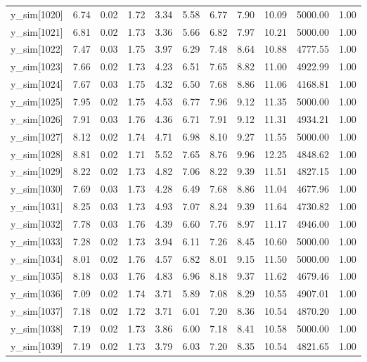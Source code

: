 \begin{table}[ht]
\begin{tabular}{rrrrrrrrrrr}
  y\_sim[1020] & 6.74 & 0.02 & 1.72 & 3.34 & 5.58 & 6.77 & 7.90 & 10.09 & 5000.00 & 1.00 \\ 
  y\_sim[1021] & 6.81 & 0.02 & 1.73 & 3.36 & 5.66 & 6.82 & 7.97 & 10.21 & 5000.00 & 1.00 \\ 
  y\_sim[1022] & 7.47 & 0.03 & 1.75 & 3.97 & 6.29 & 7.48 & 8.64 & 10.88 & 4777.55 & 1.00 \\ 
  y\_sim[1023] & 7.66 & 0.02 & 1.73 & 4.23 & 6.51 & 7.65 & 8.82 & 11.00 & 4922.99 & 1.00 \\ 
  y\_sim[1024] & 7.67 & 0.03 & 1.75 & 4.32 & 6.50 & 7.68 & 8.86 & 11.06 & 4168.81 & 1.00 \\ 
  y\_sim[1025] & 7.95 & 0.02 & 1.75 & 4.53 & 6.77 & 7.96 & 9.12 & 11.35 & 5000.00 & 1.00 \\ 
  y\_sim[1026] & 7.91 & 0.03 & 1.76 & 4.36 & 6.71 & 7.91 & 9.12 & 11.31 & 4934.21 & 1.00 \\ 
  y\_sim[1027] & 8.12 & 0.02 & 1.74 & 4.71 & 6.98 & 8.10 & 9.27 & 11.55 & 5000.00 & 1.00 \\ 
  y\_sim[1028] & 8.81 & 0.02 & 1.71 & 5.52 & 7.65 & 8.76 & 9.96 & 12.25 & 4848.62 & 1.00 \\ 
  y\_sim[1029] & 8.22 & 0.02 & 1.73 & 4.82 & 7.06 & 8.22 & 9.39 & 11.51 & 4827.15 & 1.00 \\ 
  y\_sim[1030] & 7.69 & 0.03 & 1.73 & 4.28 & 6.49 & 7.68 & 8.86 & 11.04 & 4677.96 & 1.00 \\ 
  y\_sim[1031] & 8.25 & 0.03 & 1.73 & 4.93 & 7.07 & 8.24 & 9.39 & 11.64 & 4730.82 & 1.00 \\ 
  y\_sim[1032] & 7.78 & 0.03 & 1.76 & 4.39 & 6.60 & 7.76 & 8.97 & 11.17 & 4946.00 & 1.00 \\ 
  y\_sim[1033] & 7.28 & 0.02 & 1.73 & 3.94 & 6.11 & 7.26 & 8.45 & 10.60 & 5000.00 & 1.00 \\ 
  y\_sim[1034] & 8.01 & 0.02 & 1.76 & 4.57 & 6.82 & 8.01 & 9.15 & 11.50 & 5000.00 & 1.00 \\ 
  y\_sim[1035] & 8.18 & 0.03 & 1.76 & 4.83 & 6.96 & 8.18 & 9.37 & 11.62 & 4679.46 & 1.00 \\ 
  y\_sim[1036] & 7.09 & 0.02 & 1.74 & 3.71 & 5.89 & 7.08 & 8.29 & 10.55 & 4907.01 & 1.00 \\ 
  y\_sim[1037] & 7.18 & 0.02 & 1.72 & 3.71 & 6.01 & 7.20 & 8.36 & 10.54 & 4870.20 & 1.00 \\ 
  y\_sim[1038] & 7.19 & 0.02 & 1.73 & 3.86 & 6.00 & 7.18 & 8.41 & 10.58 & 5000.00 & 1.00 \\ 
  y\_sim[1039] & 7.19 & 0.02 & 1.73 & 3.79 & 6.03 & 7.20 & 8.35 & 10.54 & 4821.65 & 1.00 \\ 

\end{tabular}
\end{table}
